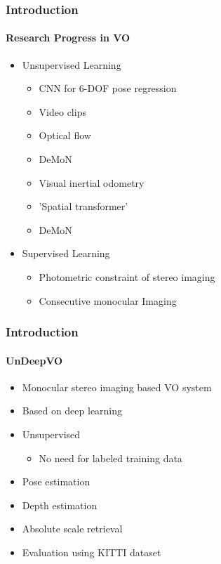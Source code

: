 \begin{frame}
    \frametitle{Introduction}
    \framesubtitle{Research Progress in VO}
    \begin{itemize} 
    \item Unsupervised Learning
     \begin{itemize}
        \item CNN for 6-DOF pose regression
        \item Video clips
        \item Optical flow 
        \item DeMoN
        \item Visual inertial odometry 
        \item 'Spatial transformer'
        \item DeMoN
        \end{itemize}
    \end{itemize}
    \begin{itemize} 
    \item Supervised Learning
     \begin{itemize}
        \item Photometric constraint of stereo imaging
        \item Consecutive monocular Imaging
        \end{itemize}
    \end{itemize}
\end{frame}

\begin{frame}
    \frametitle{Introduction}
    \framesubtitle{UnDeepVO}
    \begin{itemize}
        \item Monocular stereo imaging based VO system
        \item Based on deep learning
        \item Unsupervised
        \begin{itemize}
            \item No need for labeled training data
        \end{itemize}
        \item Pose estimation
        \item Depth estimation
        \item Absolute scale retrieval 
        \item Evaluation using KITTI dataset
    \end{itemize}
\end{frame}
